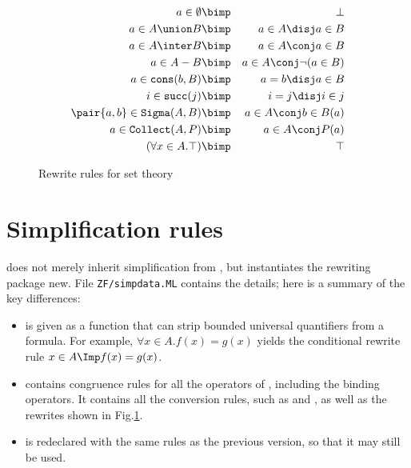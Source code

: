 \begin{figure}
\begin{eqnarray*}
  a\in \emptyset        & \bimp &  \bot\\
  a \in A \union B      & \bimp &  a\in A \disj a\in B\\
  a \in A \inter B      & \bimp &  a\in A \conj a\in B\\
  a \in A-B             & \bimp &  a\in A \conj \neg (a\in B)\\
  a \in {\tt cons}(b,B) & \bimp &  a=b \disj a\in B\\
  i \in {\tt succ}(j)   & \bimp &  i=j \disj i\in j\\
  \pair{a,b}\in {\tt Sigma}(A,B)
                        & \bimp &  a\in A \conj b\in B(a)\\
  a \in {\tt Collect}(A,P)      & \bimp &  a\in A \conj P(a)\\
  (\forall x \in A. \top)       & \bimp &  \top
\end{eqnarray*}
\caption{Rewrite rules for set theory} \label{ZF-simpdata}
\end{figure}


\section{Simplification rules}
{\ZF} does not merely inherit simplification from \FOL, but instantiates
the rewriting package new.  File {\tt ZF/simpdata.ML} contains the
details; here is a summary of the key differences:
\begin{itemize}
\item 
{} is given as a function that can
strip bounded universal quantifiers from a formula.  For example, $\forall
x\in A.f(x)=g(x)$ yields the conditional rewrite rule $x\in A \Imp
f(x)=g(x)$.
\item
{} contains congruence rules for all the operators of
{\ZF}, including the binding operators.  It contains all the conversion
rules, such as  and , as well as the
rewrites shown in Fig.\ts\ref{ZF-simpdata}.
\item
{} is redeclared with the same {\FOL} rules as the
previous version, so that it may still be used.  
\end{itemize}


